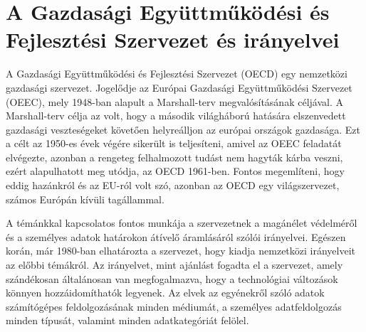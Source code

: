 \section{A Gazdasági Együttműködési és Fejlesztési Szervezet és irányelvei}

A Gazdasági Együttműködési és Fejlesztési Szervezet (OECD) egy nemzetközi gazdasági szervezet. Jogelődje az Európai Gazdasági Együttműködési Szervezet (OEEC), mely 1948-ban alapult a Marshall-terv megvalósításának céljával. A Marshall-terv célja az volt, hogy a második világháború hatására elszenvedett gazdasági veszteségeket követően helyreálljon az európai országok gazdasága. Ezt a célt az 1950-es évek végére sikerült is teljesíteni, amivel az OEEC feladatát elvégezte, azonban a rengeteg felhalmozott tudást nem hagyták kárba veszni, ezért alapulhatott meg utódja, az OECD 1961-ben. Fontos megemlíteni, hogy eddig hazánkról és az EU-ról volt szó, azonban az OECD egy világszervezet, számos Európán kívüli tagállammal.

A témánkkal kapcsolatos fontos munkája a szervezetnek a magánélet védelméről és a személyes adatok határokon átívelő áramlásáról szólói irányelvei. Egészen korán, már 1980-ban elhatározta a szervezet, hogy kiadja nemzetközi irányelveit az előbbi témákról. Az irányelvet, mint ajánlást fogadta el a szervezet, amely szándékosan általánosan van megfogalmazva, hogy a technológiai változások könnyen hozzáidomíthatók legyenek. Az elvek az egyénekről szóló adatok számítógépes feldolgozásának minden médiumát, a személyes adatfeldolgozás minden típusát, valamint minden adatkategóriát felölel.

